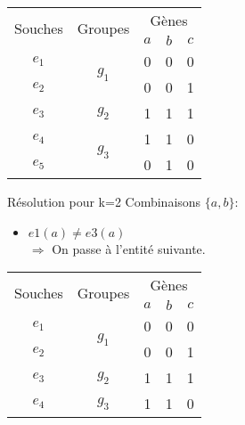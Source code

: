 \begin{overprint}
{\begin{minipage}[l]{0.46\linewidth}
				\begin{center}
					\begin{tabular}{|c||c|c|c|c|}
						\hline
						\multirow{2}{*}{Souches}&\multirow{2}{*}{Groupes}&\multicolumn{3}{c|}{Gènes
						}\\
						&&\cellcolor{blue!75}$a$&\cellcolor{blue!75}$b$&$c$\\
						\hline
						\hline
						$e_1$&\multirow{2}{*}{$g_1$}& \cellcolor{cyan}0 & 0 & 0\\
						\cline{1-1} \cline{3-5}
						$e_2$&& 0 & 0 & 1\\
						\hline
						\hline
						$e_3$&$g_2$& \cellcolor{cyan}1 & 1 & 1\\
						\hline
						\hline
						$e_4$&\multirow{2}{*}{$g_3$}& 1 & 1 & 0\\
						\cline{1-1} \cline{3-5}
						$e_5$&& 0 & 1 & 0\\
						\hline
					\end{tabular}
				\end{center}
			\end{minipage}
			\hspace{0.6cm}
			\begin{minipage}[r]{0.46\linewidth}
				\begin{block}{Résolution pour k=2}
					Combinaisons $\{a,b\}$:
					\begin{itemize}
						\item $e1(a) \not = e3(a) $ \\ $\Rightarrow$ On passe à l'entité suivante.
					\end{itemize}
				\end{block}
			\end{minipage}
		}
		\only<9>
		{
			\begin{minipage}[l]{0.46\linewidth}
				\begin{center}
					\begin{tabular}{|c||c|c|c|c|}
						\hline
						\multirow{2}{*}{Souches}&\multirow{2}{*}{Groupes}&\multicolumn{3}{c|}{Gènes
						}\\
						&&\cellcolor{blue!75}$a$&\cellcolor{blue!75}$b$&$c$\\
						\hline
						\hline
						$e_1$&\multirow{2}{*}{$g_1$}& \cellcolor{cyan}0 & 0 & 0\\
						\cline{1-1} \cline{3-5}
						$e_2$&& 0 & 0 & 1\\
						\hline
						\hline
						$e_3$&$g_2$& 1 & 1 & 1\\
						\hline
						\hline
						$e_4$&\multirow{2}{*}{$g_3$}& \cellcolor{cyan}1 & 1 & 0\\

\end{tabular}
\end{center}
\end{minipage}}
\end{overprint}
